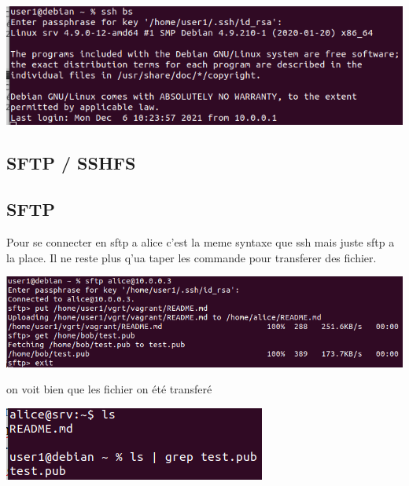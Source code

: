 \documentclass{article}
\begin{document}
 \begin{center}
        \includegraphics[scale=0.47]{Images/bsresult.png}
 \end{center}
 
 
 \newpage
 
 
 \subsection{\large{SFTP / SSHFS}}
 
 \subsection*{\normalsize{SFTP} } 
 
 Pour se connecter en sftp a alice c'est la meme syntaxe que ssh mais juste sftp a la place. Il ne reste plus q'ua taper les commande pour transferer des fichier.
 
 \begin{center}
        \includegraphics[scale=0.47]{Images/sftp.png}
 \end{center}
  
 on voit bien que les fichier on été transferé
 
 \begin{center}
        \includegraphics[scale=0.5]{Images/sftpresult.png}
 \end{center}
 
\end{document}

